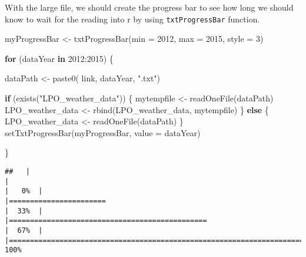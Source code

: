 \documentclass[
  11pt,
]{article}
\newenvironment{Shaded}{\begin{snugshade}}{\end{snugshade}}
\newcommand{\AttributeTok}[1]{\textcolor[rgb]{0.77,0.63,0.00}{#1}}
\newcommand{\ControlFlowTok}[1]{\textcolor[rgb]{0.13,0.29,0.53}{\textbf{#1}}}
\newcommand{\DecValTok}[1]{\textcolor[rgb]{0.00,0.00,0.81}{#1}}
\newcommand{\FunctionTok}[1]{\textcolor[rgb]{0.00,0.00,0.00}{#1}}
\newcommand{\NormalTok}[1]{#1}
\newcommand{\OtherTok}[1]{\textcolor[rgb]{0.56,0.35,0.01}{#1}}
\newcommand{\SpecialCharTok}[1]{\textcolor[rgb]{0.00,0.00,0.00}{#1}}
\newcommand{\StringTok}[1]{\textcolor[rgb]{0.31,0.60,0.02}{#1}}
\begin{document}
With the large file, we should create the progress bar to see how long
we should know to wait for the reading into r by using
\texttt{txtProgressBar} function.

\begin{Shaded}
\begin{Highlighting}[]
\NormalTok{myProgressBar }\OtherTok{\textless{}{-}} \FunctionTok{txtProgressBar}\NormalTok{(}\AttributeTok{min =} \DecValTok{2012}\NormalTok{, }\AttributeTok{max =} \DecValTok{2015}\NormalTok{, }\AttributeTok{style =} \DecValTok{3}\NormalTok{)}
\end{Highlighting}
\end{Shaded}

\begin{Shaded}
\begin{Highlighting}[]
\ControlFlowTok{for}\NormalTok{ (dataYear }\ControlFlowTok{in} \DecValTok{2012}\SpecialCharTok{:}\DecValTok{2015}\NormalTok{) \{}
  
\NormalTok{  dataPath }\OtherTok{\textless{}{-}}
    \FunctionTok{paste0}\NormalTok{(}
\NormalTok{      link,}
\NormalTok{      dataYear,}
      \StringTok{".txt"}\NormalTok{)}
  
  \ControlFlowTok{if}\NormalTok{ (}\FunctionTok{exists}\NormalTok{(}\StringTok{"LPO\_weather\_data"}\NormalTok{)) \{}
\NormalTok{    mytempfile }\OtherTok{\textless{}{-}} \FunctionTok{readOneFile}\NormalTok{(dataPath)}
\NormalTok{    LPO\_weather\_data }\OtherTok{\textless{}{-}} \FunctionTok{rbind}\NormalTok{(LPO\_weather\_data, mytempfile)}
\NormalTok{  \} }\ControlFlowTok{else}\NormalTok{ \{}
\NormalTok{    LPO\_weather\_data }\OtherTok{\textless{}{-}} \FunctionTok{readOneFile}\NormalTok{(dataPath)}
\NormalTok{  \}}
  \FunctionTok{setTxtProgressBar}\NormalTok{(myProgressBar, }\AttributeTok{value =}\NormalTok{ dataYear)}
  
\NormalTok{\}}
\end{Highlighting}
\end{Shaded}

\begin{verbatim}
##   |                                                                              |                                                                      |   0%  |                                                                              |=======================                                               |  33%  |                                                                              |===============================================                       |  67%  |                                                                              |======================================================================| 100%
\end{verbatim}
\end{document}
